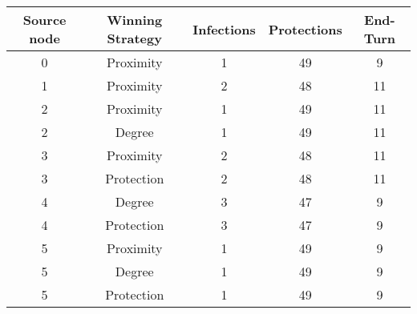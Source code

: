 \documentclass[results.tex]{subfiles}
\begin{document}
    \begin{center}
        \begin{tabular}{| c || c | c | c | c |}
            \hline
            {\bfseries Source node} & {\bfseries Winning Strategy} & {\bfseries Infections} & {\bfseries Protections}
            & {\bfseries End-Turn}
            \\  %
            \hline\hline
            0                       & Proximity                    & 1                      & 49                      & 9                    \\
            \hline
            1                       & Proximity                    & 2                      & 48                      & 11                   \\
            \hline
            2                       & Proximity                    & 1                      & 49                      & 11                   \\
            \hline
            2                       & Degree                       & 1                      & 49                      & 11                   \\
            \hline
            3                       & Proximity                    & 2                      & 48                      & 11                   \\
            \hline
            3                       & Protection                   & 2                      & 48                      & 11                   \\
            \hline
            4                       & Degree                       & 3                      & 47                      & 9                    \\
            \hline
            4                       & Protection                   & 3                      & 47                      & 9                    \\
            \hline
            5                       & Proximity                    & 1                      & 49                      & 9                    \\
            \hline
            5                       & Degree                       & 1                      & 49                      & 9                    \\
            \hline
            5                       & Protection                   & 1                      & 49                      & 9                    \\

\end{tabular}
\end{center}
\end{document}
